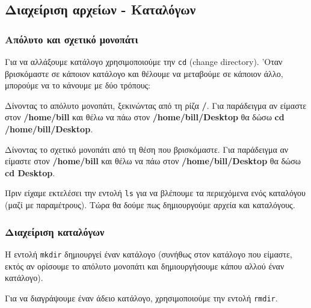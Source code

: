 \subsection{Διαχείριση αρχείων - Καταλόγων}

\subsubsection{Απόλυτο και σχετικό μονοπάτι}
Για να αλλάξουμε κατάλογο χρησιμοποιούμε την \texttt{cd} (change directory). 
'Οταν βρισκόμαστε σε κάποιον κατάλογο και θέλουμε να μεταβούμε σε κάποιον άλλο, μπορούμε να το κάνουμε με δύο τρόπους:
\begin{packed_item}
  \item Δίνοντας το απόλυτο μονοπάτι, ξεκινώντας από τη ρίζα \textbf{/}. Για παράδειγμα αν είμαστε στον \textbf{/home/bill} και θέλω να πάω 	στον \textbf{/home/bill/Desktop} θα δώσω\textbf{ cd /home/bill/Desktop}.
  \item Δίνοντας το σχετικό μονοπάτι από τη θέση που βρισκόμαστε. Για παράδειγμα αν είμαστε στον \textbf{/home/bill} και θέλω να πάω στον \textbf{/home/bill/Desktop} θα δώσω \textbf{cd Desktop}.
\end{packed_item}

Πριν είχαμε εκτελέσει την εντολή \texttt{ls} για να βλέπουμε τα περιεχόμενα ενός καταλόγου (μαζί με παραμέτρους). Τώρα θα δούμε πως δημιουργούμε αρχεία και καταλόγους.

\subsubsection{Διαχείριση καταλόγων}
Η εντολή \texttt{mkdir} δημιουργεί έναν κατάλογο (συνήθως στον κατάλογο που είμαστε, εκτός αν ορίσουμε το απόλυτο μονοπάτι και
δημιουργήσουμε κάπου αλλού έναν κατάλογο).

Για να διαγράψουμε έναν άδειο κατάλογο, χρησιμοποιούμε την εντολή \texttt{rmdir}. 

